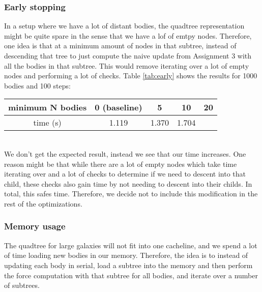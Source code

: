 \documentclass[a4paper]{scrartcl}
\begin{document}
        \subsubsection{Early stopping}
            In a setup where we have a lot of distant bodies, the quadtree
            representation might be quite spare in the sense that we have a lof
            of emtpy nodes. Therefore, one idea is that at a minimum amount of
            nodes in that subtree, instead of descending that tree to just
            compute the naive update from Assignment 3 with all the bodies in
            that subtree. This would remove iterating over a lot of empty nodes
            and performing a lot of checks. Table \ref{tab:early} shows the
            results for 1000 bodies and 100 steps:\\[10pt] 
            \noindent\begin{tabular}{c|c|c|c|c}\label{tab:early}
                minimum N bodies & 0 (baseline) & 5 & 10 & 20 \\
                \hline
                time (s) & 1.119 & 1.370 & 1.704\\
            \end{tabular}\\

            We don't get the expected result, instead we see that our time
            increases. One reason might be that while there are a lot of empty
            nodes which take time iterating over and a lot of checks to
            determine if we need to descent into that child, these checks also
            gain time by not needing to descent into their childs. In total,
            this safes time. Therefore, we decide not to include this
            modification in the rest of the optimizations.
            

        \subsubsection{Memory usage}
            The quadtree for large galaxies will not fit into one cacheline, and
            we spend a lot of time loading new bodies in our memory. Therefore,
            the idea is to instead of updating each body in serial, load a
            subtree into the memory and then perform the force computation with
            that subtree for all bodies, and iterate over a number of subtrees.
\end{document}
